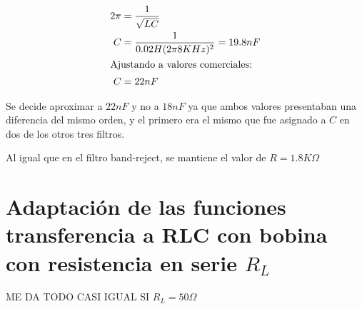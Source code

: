 \begin{align*}
2\pi &= \frac{1}{\sqrt{LC}} \\
C &= \frac{1}{0.02H (2\pi 8KHz)^2} = 19.8nF\\
\intertext{Ajustando a valores comerciales:}
C &= 22nF
\end{align*}

Se decide aproximar a $22nF$ y no a $18nF$ ya que ambos valores presentaban una diferencia del mismo orden, y el primero era el mismo que fue asignado a $C$ en dos de los otros tres filtros.

Al igual que en el filtro band-reject, se mantiene el valor de $R=1.8K\Omega$

\section{Adaptaci\'on de las funciones transferencia a RLC con bobina con resistencia en serie $R_L$}

ME DA TODO CASI IGUAL SI $R_L = 50\Omega$
